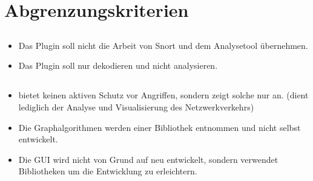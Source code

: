 \section{Abgrenzungskriterien}

\subsection{\sppname}
\begin{itemize}
\item Das Plugin soll nicht die Arbeit von Snort und dem Analysetool übernehmen.

\item Das Plugin soll nur dekodieren und nicht analysieren.

\end{itemize}

\subsection{\programname}
\begin{itemize}

\item \programname bietet keinen aktiven Schutz vor Angriffen, sondern zeigt solche nur an. (dient lediglich der Analyse und Visualisierung des Netzwerkverkehrs)

\item Die Graphalgorithmen  werden einer Bibliothek entnommen und nicht selbst entwickelt.

\item Die GUI wird nicht von Grund auf neu entwickelt, sondern verwendet Bibliotheken um die Entwicklung zu erleichtern.

\end{itemize} 